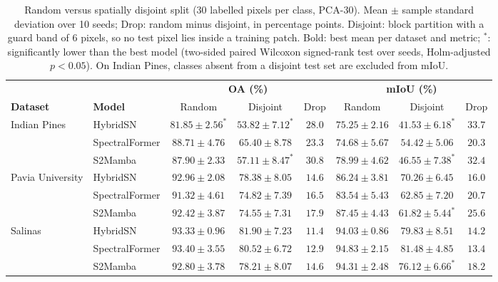 \begin{table}[!t]
\centering
\caption{Random versus spatially disjoint split (30 labelled pixels per class, PCA-30). Mean $\pm$ sample standard deviation over 10 seeds; Drop: random minus disjoint, in percentage points. Disjoint: block partition with a guard band of 6 pixels, so no test pixel lies inside a training patch. Bold: best mean per dataset and metric; $^{*}$: significantly lower than the best model (two-sided paired Wilcoxon signed-rank test over seeds, Holm-adjusted $p<0.05$). On Indian Pines, classes absent from a disjoint test set are excluded from mIoU.}
\label{tab:disjoint}
\scriptsize
\setlength{\tabcolsep}{3pt}
\renewcommand{\arraystretch}{1.15}
\begin{tabular}{llcccccc}
\toprule
 & & \multicolumn{3}{c}{\textbf{OA (\%)}} & \multicolumn{3}{c}{\textbf{mIoU (\%)}} \\
\cmidrule(lr){3-5}\cmidrule(lr){6-8}
\textbf{Dataset} & \textbf{Model} & Random & Disjoint & Drop & Random & Disjoint & Drop \\
\midrule
\multirow{3}{*}{Indian Pines} & HybridSN & $81.85 \pm 2.56^{*}$ & $53.82 \pm 7.12^{*}$ & $28.0$ & $75.25 \pm 2.16$ & $41.53 \pm 6.18^{*}$ & $33.7$ \\
 & SpectralFormer & $\mathbf{88.71 \pm 4.76}$ & $\mathbf{65.40 \pm 8.78}$ & $23.3$ & $74.68 \pm 5.67$ & $\mathbf{54.42 \pm 5.06}$ & $20.3$ \\
 & S2Mamba & $87.90 \pm 2.33$ & $57.11 \pm 8.47^{*}$ & $30.8$ & $\mathbf{78.99 \pm 4.62}$ & $46.55 \pm 7.38^{*}$ & $32.4$ \\
\midrule
\multirow{3}{*}{Pavia University} & HybridSN & $\mathbf{92.96 \pm 2.08}$ & $\mathbf{78.38 \pm 8.05}$ & $14.6$ & $86.24 \pm 3.81$ & $\mathbf{70.26 \pm 6.45}$ & $16.0$ \\
 & SpectralFormer & $91.32 \pm 4.61$ & $74.82 \pm 7.39$ & $16.5$ & $83.54 \pm 5.43$ & $62.85 \pm 7.20$ & $20.7$ \\
 & S2Mamba & $92.42 \pm 3.87$ & $74.55 \pm 7.31$ & $17.9$ & $\mathbf{87.45 \pm 4.43}$ & $61.82 \pm 5.44^{*}$ & $25.6$ \\
\midrule
\multirow{3}{*}{Salinas} & HybridSN & $93.33 \pm 0.96$ & $\mathbf{81.90 \pm 7.23}$ & $11.4$ & $94.03 \pm 0.86$ & $79.83 \pm 8.51$ & $14.2$ \\
 & SpectralFormer & $\mathbf{93.40 \pm 3.55}$ & $80.52 \pm 6.72$ & $12.9$ & $\mathbf{94.83 \pm 2.15}$ & $\mathbf{81.48 \pm 4.85}$ & $13.4$ \\
 & S2Mamba & $92.80 \pm 3.78$ & $78.21 \pm 8.07$ & $14.6$ & $94.31 \pm 2.48$ & $76.12 \pm 6.66^{*}$ & $18.2$ \\
\bottomrule
\end{tabular}
\end{table}
